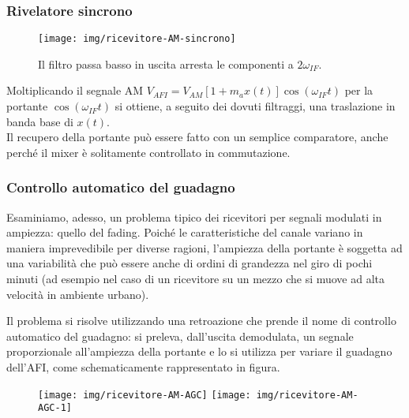 \subsubsection{Rivelatore sincrono}

\begin{figure}[hbt]
	\centering
	\texttt{[image: img/ricevitore-AM-sincrono]}
	\caption{Il filtro passa basso in uscita arresta le componenti a $2\omega_{IF}$.}
	\label{fig:ricevitore-am-sincrono}
\end{figure}

Moltiplicando il segnale AM $V_{AFI} = V_{AM}[1+m_ax(t)]\cos(\omega_{IF}t)$ per la portante $\cos(\omega_{IF}t)$ si ottiene, a seguito dei dovuti filtraggi, una traslazione in banda base di $x(t)$.
\\
Il recupero della portante può essere fatto con un semplice comparatore, anche perché il mixer è solitamente controllato in commutazione.

\subsubsection{Controllo automatico del guadagno}

Esaminiamo, adesso, un problema tipico dei ricevitori per segnali modulati in ampiezza: quello del
fading. Poiché le caratteristiche del canale variano in maniera imprevedibile per diverse ragioni,
l'ampiezza della portante è soggetta ad una variabilità che può essere anche di ordini di grandezza
nel giro di pochi minuti (ad esempio nel caso di un ricevitore su un mezzo che si muove ad alta
velocità in ambiente urbano).

Il problema si risolve utilizzando una retroazione che prende il nome di controllo automatico del guadagno: si preleva, dall'uscita demodulata, un segnale proporzionale all'ampiezza della portante e lo si utilizza per variare il guadagno dell'AFI, come schematicamente rappresentato in figura.

\begin{figure}[hbt]
	\centering
	\texttt{[image: img/ricevitore-AM-AGC]}
	\texttt{[image: img/ricevitore-AM-AGC-1]}
	\caption{}
	\label{fig:ricevitore-am-agc}
\end{figure}


